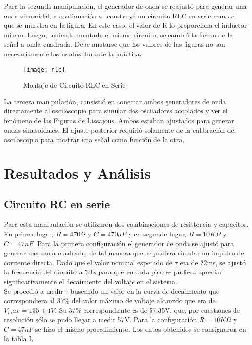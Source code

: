 \documentclass[%
 reprint,
 amsmath,amssymb,
 aps,
]{revtex4-1}
\begin{document}
Para la segunda manipulaci\'on, el generador de onda se reajust\'o para generar una onda sinusoidal, a continuaci\'on se construy\'o un circuito RLC en serie como el que se muestra en la figura. En este caso, el valor de R lo proporciona el inductor mismo. Luego, teniendo montado el mismo circuito, se cambi\'o la forma de la señal a onda cuadrada. Debe anotarse que los valores de las figuras no son necesariamente los usados durante la pr\'actica. \\

\begin{figure}[h!]
\caption{Montaje de Circuito RLC en Serie}
\centering
\texttt{[image: rlc]}
\end{figure}


La tercera manipulaci\'on, consisti\'o en conectar ambos generadores de onda directamente al osciloscopio para simular dos osciladores acoplados y ver el fen\'omeno de las Figuras de Lissajous. Ambos estaban ajustados para generar ondas sinusoidales. El ajuste posterior requiri\'o solamente de la calibraci\'on del osciloscopio para mostrar una señal como funci\'on de la otra. 


\section{\label{sec:level1}Resultados y An\'alisis}

\subsection{\label{sec:level2}Circuito RC en serie}
Para esta manipulaci\'on se utilizaron dos combinaciones de resistencia y capacitor. En primer lugar, $R = 470\Omega$ y $C=470\mu F$ y en segundo lugar, $R=10K\Omega$ y $C = 47nF$. Para la primera configuraci\'on el generador de onda se ajust\'o para generar una onda cuadrada, de tal manera que se pudiera simular un impulso de corriente directa. Dado que el valor nominal esperado de $\tau$ era de 22ms, se ajust\'o la frecuencia del circuito a 5Hz para que en cada pico se pudiera apreciar significativamente el decaimiento del voltaje en el sistema.\\

Se procedi\'o a medir $\tau$ buscando un valor en la curva de decaimiento que correspondiera al 37\% del valor m\'aximo de voltaje alcanzdo que era de $V_max=155\pm 1V$. Su 37\% correspondiente es de 57.35V, que, por cuestiones de resoluci\'on s\'olo se pudo llegar a medir 57V. Para la configuración $R=10K\Omega$ y $C = 47nF$ se hizo el mismo procedimiento. Los datos obtenidos se consignaron en la tabla I.\\
\end{document}
